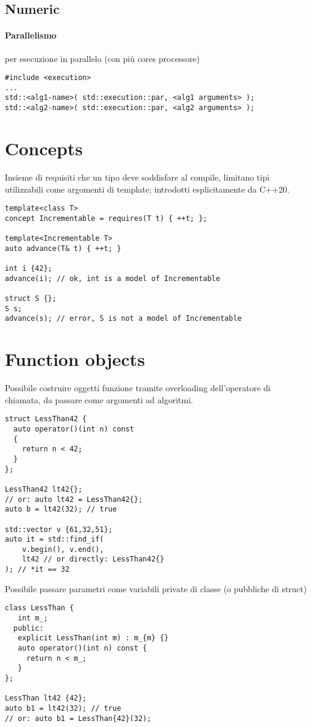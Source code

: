 \documentclass[10pt, oneside]{Book}
\begin{document}
\subsection{Numeric}

\paragraph{Parallelismo} per esecuzione in parallelo (con più cores processore)
\begin{verbatim}
#include <execution>
...
std::<alg1-name>( std::execution::par, <alg1 arguments> );
std::<alg2-name>( std::execution::par, <alg2 arguments> );
\end{verbatim}

\section{Concepts}
Insieme di requisiti che un tipo deve soddisfare al compile, limitano tipi utilizzabili come argomenti di template; introdotti esplicitamente da C++20.
\begin{verbatim}
template<class T>
concept Incrementable = requires(T t) { ++t; };

template<Incrementable T>
auto advance(T& t) { ++t; }

int i {42};
advance(i); // ok, int is a model of Incrementable

struct S {};
S s;
advance(s); // error, S is not a model of Incrementable
\end{verbatim}

\section{Function objects}
Possibile costruire oggetti funzione tramite overloading dell'operatore di chiamata, da passare come argomenti ad algoritmi.
\begin{verbatim}
struct LessThan42 {
  auto operator()(int n) const
  {
    return n < 42;
  }
};

LessThan42 lt42{};
// or: auto lt42 = LessThan42{};
auto b = lt42(32); // true

std::vector v {61,32,51};
auto it = std::find_if(
    v.begin(), v.end(),
    lt42 // or directly: LessThan42{}
); // *it == 32
\end{verbatim}
Possibile passare parametri come variabili private di classe (o pubbliche di struct)
\begin{verbatim}
class LessThan {
   int m_;
  public:
   explicit LessThan(int m) : m_{m} {}
   auto operator()(int n) const {
     return n < m_;
   }
};

LessThan lt42 {42};
auto b1 = lt42(32); // true
// or: auto b1 = LessThan{42}(32);
\end{verbatim}
\end{document}
